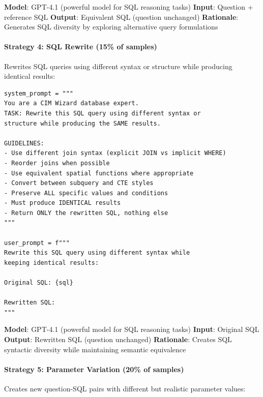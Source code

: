 \textbf{Model}: GPT-4.1 (powerful model for SQL reasoning tasks)
\textbf{Input}: Question + reference SQL
\textbf{Output}: Equivalent SQL (question unchanged)
\textbf{Rationale}: Generates SQL diversity by exploring alternative query formulations

\paragraph{Strategy 4: SQL Rewrite (15\% of samples)}

Rewrites SQL queries using different syntax or structure while producing identical results:

\begin{lstlisting}[style=pythonstyle, caption=SQL rewrite strategy]
system_prompt = """
You are a CIM Wizard database expert.
TASK: Rewrite this SQL query using different syntax or 
structure while producing the SAME results.

GUIDELINES:
- Use different join syntax (explicit JOIN vs implicit WHERE)
- Reorder joins when possible
- Use equivalent spatial functions where appropriate
- Convert between subquery and CTE styles
- Preserve ALL specific values and conditions
- Must produce IDENTICAL results
- Return ONLY the rewritten SQL, nothing else
"""

user_prompt = f"""
Rewrite this SQL query using different syntax while 
keeping identical results:

Original SQL: {sql}

Rewritten SQL:
"""
\end{lstlisting}

\textbf{Model}: GPT-4.1 (powerful model for SQL reasoning tasks)
\textbf{Input}: Original SQL
\textbf{Output}: Rewritten SQL (question unchanged)
\textbf{Rationale}: Creates SQL syntactic diversity while maintaining semantic equivalence

\paragraph{Strategy 5: Parameter Variation (20\% of samples)}

Creates new question-SQL pairs with different but realistic parameter values:

